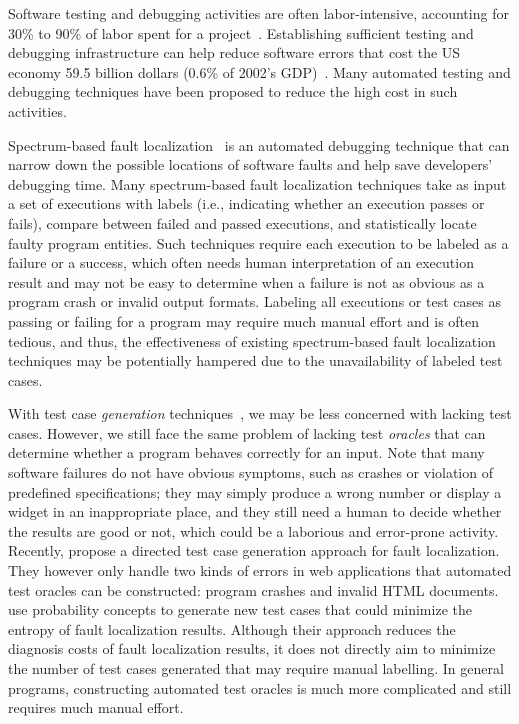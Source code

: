 
Software testing and debugging activities are often labor-intensive, accounting for 30\% to 90\% of labor spent for a project~\citep{Beizer1990}. Establishing sufficient testing and debugging infrastructure can help reduce software errors that cost the US economy 59.5 billion dollars (0.6\% of 2002's GDP)~\citep{NIST2002}.
Many automated testing and debugging techniques have been proposed to reduce the high cost in such activities.


Spectrum-based fault localization~\citep[e.g.][]{JHS02,Abreu:2009.jss,campos2013entropy} is an automated debugging technique that can narrow down the possible locations of software faults and help save developers' debugging time. Many spectrum-based fault localization techniques take as input a set of executions with labels (i.e., indicating whether an execution passes or fails), compare between failed and passed executions, and statistically locate faulty program entities. Such techniques require each execution to be labeled as a failure or a success, which often needs human interpretation of an execution result and may not be easy to determine when a failure is not as obvious as a program crash or invalid output formats. Labeling all executions or test cases as passing or failing for a program may require much manual effort and is often tedious, and thus, the effectiveness of existing spectrum-based fault localization techniques may be potentially hampered due to the unavailability of labeled test cases.

With test case {\em generation} techniques~\citep{GodefroidKS05,SenMA05}, we may be less concerned with lacking test cases. However, we still face the same problem of lacking test {\em oracles} that can determine whether a program behaves correctly for an input. Note that many software failures do not have obvious symptoms, such as crashes or violation of predefined specifications; they may simply produce a wrong number or display a widget in an inappropriate place, and they still need a human to decide whether the results are good or not, which could be a laborious and error-prone activity. Recently, \cite{ArtziDTP10} propose a directed test case generation approach for fault localization. They however only handle two kinds of errors in web applications that automated test oracles can be constructed: program crashes and invalid HTML documents.
\cite{campos2013entropy} use probability concepts to generate new test cases that could minimize the entropy of fault localization results. Although their approach reduces the diagnosis costs of fault localization results, it does not directly aim to minimize the number of test cases generated that may require manual labelling.
In general programs,
constructing automated test oracles is much more complicated and still requires much manual effort.


